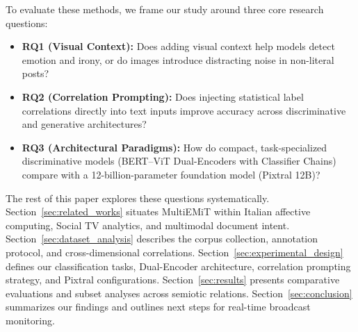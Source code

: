 To evaluate these methods, we frame our study around three core research questions:
\begin{itemize}
    \item \textbf{RQ1 (Visual Context):} Does adding visual context help models detect emotion and irony, or do images introduce distracting noise in non-literal posts?
    \item \textbf{RQ2 (Correlation Prompting):} Does injecting statistical label correlations directly into text inputs improve accuracy across discriminative and generative architectures?
    \item \textbf{RQ3 (Architectural Paradigms):} How do compact, task-specialized discriminative models (BERT--ViT Dual-Encoders with Classifier Chains) compare with a 12-billion-parameter foundation model (Pixtral 12B)?
\end{itemize}

The rest of this paper explores these questions systematically. Section~\ref{sec:related_works} situates MultiEMiT within Italian affective computing, Social TV analytics, and multimodal document intent. Section~\ref{sec:dataset_analysis} describes the corpus collection, annotation protocol, and cross-dimensional correlations. Section~\ref{sec:experimental_design} defines our classification tasks, Dual-Encoder architecture, correlation prompting strategy, and Pixtral configurations. Section~\ref{sec:results} presents comparative evaluations and subset analyses across semiotic relations. Section~\ref{sec:conclusion} summarizes our findings and outlines next steps for real-time broadcast monitoring.
